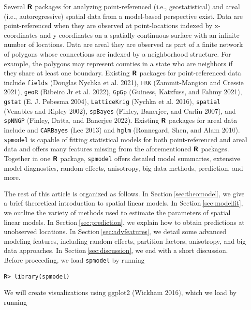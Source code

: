 \documentclass{article}
\begin{document}
Several \(\textbf{\textsf{R}}\) packages for analyzing point-referenced
(i.e., geostatistical) and areal (i.e., autoregressive) spatial data
from a model-based perspective exist. Data are point-referenced when
they are observed at point-locations indexed by x-coordinates and
y-coordinates on a spatially continuous surface with an infinite number
of locations. Data are areal they are observed as part of a finite
network of polygons whose connections are indexed by a neighborhood
structure. For example, the polygons may represent counties in a state
who are neighbors if they share at least one boundary. Existing
\(\textbf{\textsf{R}}\) packages for point-referenced data include
\texttt{fields} (Douglas Nychka et al. 2021), \texttt{FRK}
(Zammit-Mangion and Cressie 2021), \texttt{geoR} (Ribeiro Jr et al.
2022), \texttt{GpGp} (Guiness, Katzfuss, and Fahmy 2021), \texttt{gstat}
(E. J. Pebesma 2004), \texttt{LatticeKrig} (Nychka et al. 2016),
\texttt{spatial} (Venables and Ripley 2002), \texttt{spBayes} (Finley,
Banerjee, and Carlin 2007), and \texttt{spNNGP} (Finley, Datta, and
Banerjee 2022). Existing \(\textbf{\textsf{R}}\) packages for areal data
include and \texttt{CARBayes} (Lee 2013) and \texttt{hglm} (Ronnegard,
Shen, and Alam 2010). \texttt{spmodel} is capable of fitting statistical
models for both point-referenced and areal data and offers many features
missing from the aforementioned \(\textbf{\textsf{R}}\) packages.
Together in one \(\textbf{\textsf{R}}\) package, \texttt{spmodel} offers
detailed model summaries, extensive model diagnostics, random effects,
anisotropy, big data methods, prediction, and more.

The rest of this article is organized as follows. In
Section\(~\)\ref{sec:theomodel}, we give a brief theoretical
introduction to spatial linear models. In
Section\(~\)\ref{sec:modelfit}, we outline the variety of methods used
to estimate the parameters of spatial linear models. In
Section\(~\)\ref{sec:prediction}, we explain how to obtain predictions
at unobserved locations. In Section\(~\)\ref{sec:advfeatures}, we detail
some advanced modeling features, including random effects, partition
factors, anisotropy, and big data approaches. In
Section\(~\)\ref{sec:discussion}, we end with a short discussion. Before
proceeding, we load \texttt{spmodel} by running

\begin{verbatim}
R> library(spmodel)
\end{verbatim}

We will create visualizations using ggplot2 (Wickham 2016), which we
load by running
\end{document}
